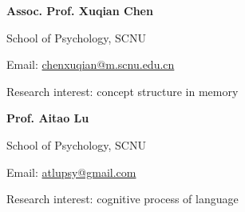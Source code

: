 \documentclass[a4paper, 12pt]{article}
\begin{document}
\begin{multicols}{2}
    
    \ \ \textbf{Assoc. Prof. Xuqian Chen} \par
    \ \ School of Psychology, SCNU \par
    \ \ Email: \href{mailto: chenxuqian@m.scnu.edu.cn}{chenxuqian@m.scnu.edu.cn} \par
    \ \ Research interest: concept structure in memory	\par
    
    \columnbreak

    \ \ \textbf{Prof. Aitao Lu}  \par
    \ \ School of Psychology, SCNU \par
    \ \ Email: \href{mailto: atlupsy@gmail.com}{atlupsy@gmail.com} \par
    \ \ Research interest: cognitive process of language \par
    
    \end{multicols}
\end{document}
